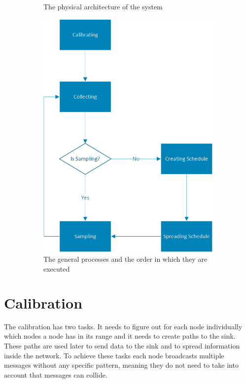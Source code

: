 \begin{figure}[htbp]
\begin{subfigure}[t]{0.4\textwidth}
   	 	\caption{The physical architecture of the system}
    	\label{fig:architecture}
    \end{subfigure}
    \quad
    \quad
    \quad
    \begin{subfigure}[t]{0.4\textwidth}
		\centering         
        \includegraphics[scale=0.7]{content/images/GeneralAproachM}
        \caption{The general processes and the order in which they are executed}
        \label{fig:processes}
    \end{subfigure}
    \caption{}
\end{figure}
  
\section{Calibration}
\label{chp:apr_calibration}
The calibration has two tasks. It needs to figure out for each node individually which nodes a node has in its range and it needs to create paths to the sink. These paths are used later to send data to the sink and to spread information inside the network. To achieve these tasks each node broadcasts multiple messages without any specific pattern, meaning they do not need to take into account that messages can collide.

